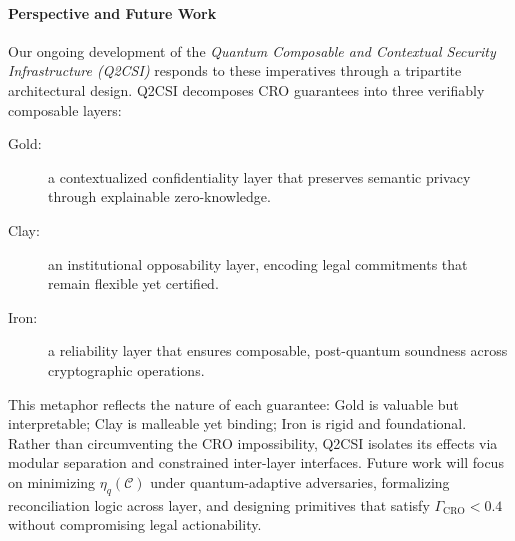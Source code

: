 \documentclass[preprint,12pt]{elsarticle}
\begin{document}
        \paragraph{Perspective and Future Work}
            Our ongoing development of the \emph{Quantum Composable and Contextual Security Infrastructure (Q2CSI)} responds to these imperatives through a tripartite architectural design. Q2CSI decomposes CRO guarantees into three verifiably composable layers:
            \begin{description}
                \item[Gold:] a contextualized confidentiality layer that preserves semantic privacy through explainable zero-knowledge.
                \item[Clay:] an institutional opposability layer, encoding legal commitments that remain flexible yet certified.
                \item[Iron:] a reliability layer that ensures composable, post-quantum soundness across cryptographic operations.
            \end{description}
            This metaphor reflects the nature of each guarantee: Gold is valuable but interpretable; Clay is malleable yet binding; Iron is rigid and foundational. Rather than circumventing the CRO impossibility, Q2CSI isolates its effects via modular separation and constrained inter-layer interfaces. Future work will focus on minimizing $\eta_q(\mathcal{C})$ under quantum-adaptive adversaries, formalizing reconciliation logic across layer, and designing primitives that satisfy $\Gamma_{\text{CRO}} < 0.4$ without compromising legal actionability.
\end{document}
